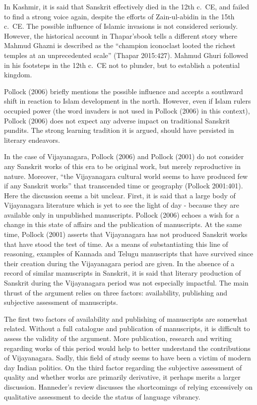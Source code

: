 In Kashmir, it is said that Sanskrit effectively died in the 12th c.\ CE, and failed to find a strong voice again, despite the efforts of Zain-ul-abidin in the 15th c.\ CE. The possible influence of Islamic invasions is not considered seriously. However, the historical account in Thapar’sbook tells a different story where Mahmud Ghazni is described as the “champion iconoclast looted the richest temples at an unprecedented scale” (Thapar 2015:427). Mahmud Ghuri followed in his footsteps in the 12th c.\ CE not to plunder, but to establish a potential kingdom.
\vskip 1.5pt

Pollock (2006) briefly mentions the possible influence and accepts a southward shift in reaction to Islam development in the north. However, even if Islam rulers occupied power (the word invaders is not used in Pollock (2006) in this context), Pollock (2006) does not expect any adverse impact on traditional Sanskrit pundits. The strong learning tradition it is argued, should have persisted in literary endeavors. 
\vskip 1.5pt

In the case of Vijayanagara, Pollock (2006) and Pollock (2001) do not consider any Sanskrit works of this era to be original work, but merely reproductive in nature. Moreover, “the Vijayanagara cultural world seems to have produced few if any Sanskrit works” that transcended time or geography (Pollock 2001:401). Here the discussion seems a bit unclear. First, it is said that a large body of Vijayanagara literature which is yet to see the light of day - because they are available only in unpublished manuscripts. Pollock (2006) echoes a wish for a change in this state of affairs and the publication of manuscripts. At the same time, Pollock (2001) asserts that Vijayanagara has not produced Sanskrit works that have stood the test of time. As a means of substantiating this line of reasoning, examples of Kannada and Telugu manuscripts that have survived since their creation during the Vijayanagara period are given. In the absence of a record of similar manuscripts in Sanskrit, it is said that literary production of Sanskrit during the Vijayanagara period was not especially impactful. The main thrust of the argument relies on three factors: availability, publishing and subjective assessment of manuscripts.
\vskip 1.5pt

The first two factors of availability and publishing of manuscripts are somewhat related. Without a full catalogue and publication of manuscripts, it is difficult to assess the validity of the argument. More publication, research and writing regarding works of this period would help to better understand the contributions of Vijayanagara. Sadly, this field of study seems to have been a victim of modern day Indian politics. On the third factor regarding the subjective assessment of quality and whether works are primarily derivative, it perhaps merits a larger discussion. Hanneder’s review discusses the shortcomings of relying excessively on qualitative assessment to decide the status of language vibrancy. 
\vskip 1.5pt

